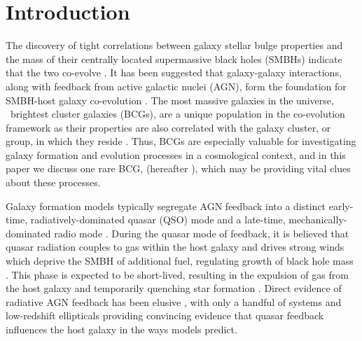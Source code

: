 \documentclass[useAMS,usenatbib]{mn2e}
\begin{document}
\section{Introduction}
\label{sec:intro}

The discovery of tight correlations between galaxy stellar bulge
properties and the mass of their centrally located supermassive black
holes (SMBHs) indicate that the two co-evolve
\citep[\eg][]{1995ARA&A..33..581K, magorrian, 2000ApJ...539L...9F,
  2000ApJ...539L..13G, 2001ApJ...563L..11G}. It has been suggested
that galaxy-galaxy interactions, along with feedback from active
galactic nuclei (AGN), form the foundation for SMBH-host galaxy
co-evolution \citep[\eg][]{1995MNRAS.276..663B, 1998A&A...331L...1S,
  2000MNRAS.311..576K, 2001MNRAS.324..757G}. The most massive galaxies
in the universe, \eg\ brightest cluster galaxies (BCGs), are a unique
population in the co-evolution framework as their properties are also
correlated with the galaxy cluster, or group, in which they reside
\citep[\eg][]{1984ApJ...276...38J, 1998ApJ...502..141D}. Thus, BCGs
are especially valuable for investigating galaxy formation and
evolution processes in a cosmological context, and in this paper we
discuss one rare BCG, \object{\inine} (hereafter \irs), which may be
providing vital clues about these processes.

Galaxy formation models typically segregate AGN feedback into a
distinct early-time, radiatively-dominated quasar (QSO) mode
\citep[\eg][]{2005Natur.435..629S, 2006ApJS..163....1H} and a
late-time, mechanically-dominated radio mode \citep[\eg][]{croton06,
  bower06}. During the quasar mode of feedback, it is believed that
quasar radiation couples to gas within the host galaxy and drives
strong winds which deprive the SMBH of additional fuel, regulating
growth of black hole mass \citep[\eg][]{2005ApJ...630..705H,
  2005Natur.433..604D}. This phase is expected to be short-lived,
resulting in the expulsion of gas from the host galaxy and temporarily
quenching star formation \citep[\eg][]{2006ApJ...642L.107N,
  2008ApJ...686..219M}. Direct evidence of radiative AGN feedback has
been elusive \citep[see][for a review]{2005ARA&A..43..769V}, with only
a handful of systems \citep[\eg][]{2008A&A...492...81P,
  2010A&A...518L.155F} and low-redshift ellipticals
\citep{2009ApJ...690.1672S} providing convincing evidence that quasar
feedback influences the host galaxy in the ways models predict.
\end{document}
